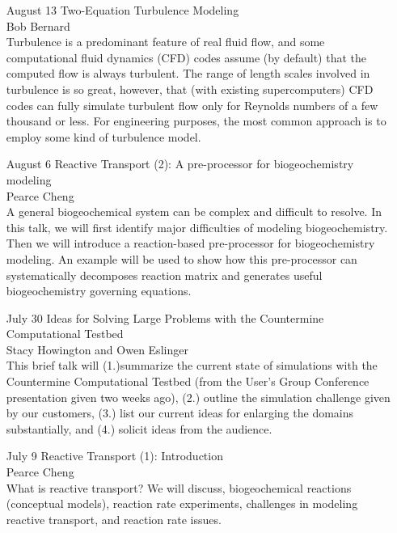 \documentclass[12]{article}
\begin{document}
\begin{enumerate}
\item[August 13] Two-Equation Turbulence Modeling\\
  Bob Bernard\\
  Turbulence is a predominant feature of real fluid flow, and some
  computational fluid dynamics (CFD) codes assume (by default) that
  the computed flow is always turbulent.  The range of length scales
  involved in turbulence is so great, however, that (with existing
  supercomputers) CFD codes can fully simulate turbulent flow only for
  Reynolds numbers of a few thousand or less.  For engineering
  purposes, the most common approach is to employ some kind of
  turbulence model.

\item[August 6] Reactive Transport (2): A pre-processor for biogeochemistry modeling\\
  Pearce Cheng\\
  A general biogeochemical system can be complex and difficult to
  resolve.  In this talk, we will first identify major difficulties of
  modeling biogeochemistry.  Then we will introduce a reaction-based
  pre-processor for biogeochemistry modeling.  An example will be used
  to show how this pre-processor can systematically decomposes
  reaction matrix and generates useful biogeochemistry governing
  equations.

\item[July 30]Ideas for Solving Large Problems with the Countermine Computational Testbed\\
  Stacy Howington and Owen Eslinger\\
  This brief talk will (1.)summarize the current state of simulations
  with the Countermine Computational Testbed (from the User's Group
  Conference presentation given two weeks ago), (2.) outline the
  simulation challenge given by our customers, (3.) list our current
  ideas for enlarging the domains substantially, and (4.) solicit
  ideas from the audience.

\item[July 9] Reactive Transport (1): Introduction\\
  Pearce Cheng \\
  What is reactive transport? We will discuss, biogeochemical
  reactions (conceptual models), reaction rate experiments, challenges
  in modeling reactive transport, and reaction rate issues.


\end{enumerate}
\end{document}
